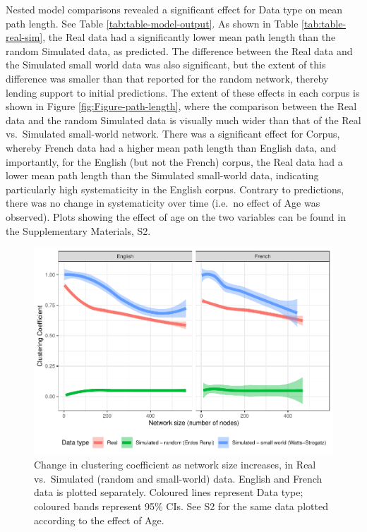 \documentclass[
  man]{apa6}
\begin{document}
Nested model comparisons revealed a significant effect for Data type on mean path length. See Table \ref{tab:table-model-output}. As shown in Table \ref{tab:table-real-sim}, the Real data had a significantly lower mean path length than the random Simulated data, as predicted. The difference between the Real data and the Simulated small world data was also significant, but the extent of this difference was smaller than that reported for the random network, thereby lending support to initial predictions. The extent of these effects in each corpus is shown in Figure \ref{fig:Figure-path-length}, where the comparison between the Real data and the random Simulated data is visually much wider than that of the Real vs.~Simulated small-world network. There was a significant effect for Corpus, whereby French data had a higher mean path length than English data, and importantly, for the English (but not the French) corpus, the Real data had a lower mean path length than the Simulated small-world data, indicating particularly high systematicity in the English corpus. Contrary to predictions, there was no change in systematicity over time (i.e.~no effect of Age was observed). Plots showing the effect of age on the two variables can be found in the Supplementary Materials, S2.

\begin{figure}
\centering
\includegraphics{NetworkGraphs_R1_files/figure-latex/Figure-clust-coef-1.pdf}
\caption{\label{fig:Figure-clust-coef}Change in clustering coefficient as network size increases, in Real vs.~Simulated (random and small-world) data. English and French data is plotted separately. Coloured lines represent Data type; coloured bands represent 95\% CIs. See S2 for the same data plotted according to the effect of Age.}
\end{figure}
\end{document}
